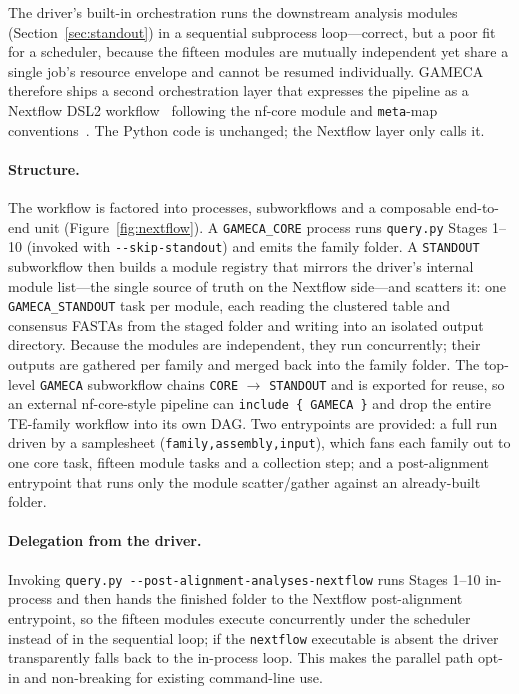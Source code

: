 \documentclass[11pt]{article}
\begin{document}
The driver's built-in orchestration runs the downstream analysis modules
(Section~\ref{sec:standout}) in a sequential subprocess loop---correct, but a poor fit for a
scheduler, because the fifteen modules are mutually independent yet share a single job's
resource envelope and cannot be resumed individually. GAMECA therefore ships a second
orchestration layer that expresses the pipeline as a Nextflow DSL2
workflow~\citep{ditommaso2017} following the nf-core module and \texttt{meta}-map
conventions~\citep{ewels2020}. The Python code is unchanged; the Nextflow layer only calls it.

\paragraph{Structure.}
The workflow is factored into processes, subworkflows and a composable end-to-end unit
(Figure~\ref{fig:nextflow}). A \texttt{GAMECA\_CORE} process runs \texttt{query.py} Stages
1--10 (invoked with \texttt{-{}-skip-standout}) and emits the family folder. A \texttt{STANDOUT}
subworkflow then builds a module registry that mirrors the driver's internal module list---the
single source of truth on the Nextflow side---and scatters it: one \texttt{GAMECA\_STANDOUT}
task per module, each reading the clustered table and consensus FASTAs from the staged folder
and writing into an isolated output directory. Because the modules are independent, they run
concurrently; their outputs are gathered per family and merged back into the family folder.
The top-level \texttt{GAMECA} subworkflow chains \texttt{CORE} $\to$ \texttt{STANDOUT} and is
exported for reuse, so an external nf-core-style pipeline can \texttt{include \{ GAMECA \}} and
drop the entire TE-family workflow into its own DAG. Two entrypoints are provided: a full
run driven by a samplesheet (\texttt{family,assembly,input}), which fans each family out to one
core task, fifteen module tasks and a collection step; and a post-alignment entrypoint that
runs only the module scatter/gather against an already-built folder.

\paragraph{Delegation from the driver.}
Invoking \texttt{query.py -{}-post-alignment-analyses-nextflow} runs Stages 1--10 in-process
and then hands the finished folder to the Nextflow post-alignment entrypoint, so the fifteen
modules execute concurrently under the scheduler instead of in the sequential loop; if the
\texttt{nextflow} executable is absent the driver transparently falls back to the in-process
loop. This makes the parallel path opt-in and non-breaking for existing command-line use.
\end{document}
